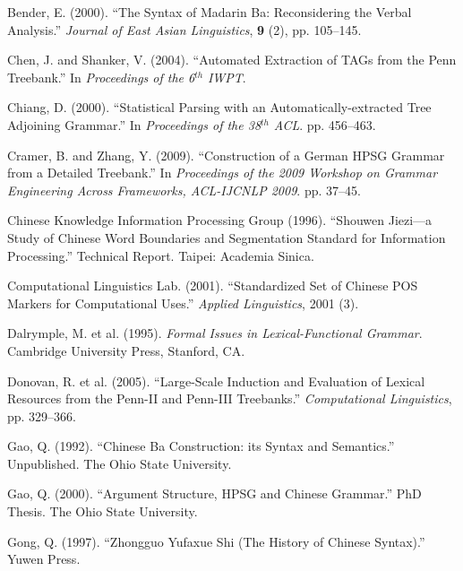 \documentclass[english]{jnlp_1.4}
\begin{document}

\begin{thebibliography}{}

\item
Bender, E. (2000). ``The Syntax of Madarin Ba: Reconsidering the Verbal 
Analysis.'' \textit{Journal of East Asian Linguistics}, \textbf{9} (2), pp. 105--145.

\item
Chen, J. and Shanker, V. (2004). ``Automated Extraction of TAGs from the 
Penn Treebank.'' In \textit{Proceedings of the 6}$^{th}$\textit{ IWPT}.

\item
Chiang, D. (2000). ``Statistical Parsing with an Automatically-extracted 
Tree Adjoining Grammar.'' In \textit{Proceedings of the 38}$^{th}$\textit{ ACL}. pp. 456--463.

\item
Cramer, B. and Zhang, Y. (2009). ``Construction of a German HPSG Grammar 
from a Detailed Treebank.'' In \textit{Proceedings of the 2009 Workshop on Grammar Engineering Across Frameworks, ACL-IJCNLP 2009}. pp. 37--45. 

\item
Chinese Knowledge Information Processing Group (1996). ``Shouwen Jiezi---a 
Study of Chinese Word Boundaries and Segmentation Standard for Information 
Processing.'' Technical Report. Taipei: Academia Sinica.

\item
Computational Linguistics Lab. (2001). ``Standardized Set of Chinese POS 
Markers for Computational Uses.'' \textit{Applied Linguistics}, 2001 (3).

\item
Dalrymple, M. et al. (1995). \textit{Formal Issues in Lexical-Functional Grammar}. 
Cambridge University Press, Stanford, CA.

\item
Donovan, R. et al. (2005). ``Large-Scale Induction and Evaluation of Lexical 
Resources from the Penn-II and Penn-III Treebanks.'' \textit{Computational Linguistics}, pp. 329--366.

\item
Gao, Q. (1992). ``Chinese Ba Construction: its Syntax and Semantics.'' 
Unpublished. The Ohio State University.

\item
Gao, Q. (2000). ``Argument Structure, HPSG and Chinese Grammar.'' PhD 
Thesis. The Ohio State University.

\item
Gong, Q. (1997). ``Zhongguo Yufaxue Shi (The History of Chinese Syntax).'' 
Yuwen Press.


\end{thebibliography}
\end{document}
